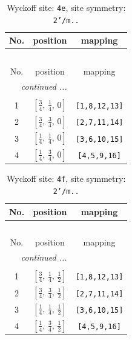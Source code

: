 \documentclass[fleqn,8pt]{jsarticle}
\begin{document}
\begin{longtable}{ccc}
\caption{Wyckoff site: {\tt 4e}, site symmetry: {\tt 2'/m..}}
 \\
 \hline \hline
No. & position & mapping \\ \hline \endfirsthead

\multicolumn{2}{l}{\tablename\ \thetable{}} \\
 \hline \hline
No. & position & mapping \\ \hline \endhead

 \hline \hline
\multicolumn{2}{r}{\footnotesize\it continued ...} \\ \endfoot

 \hline \hline
\multicolumn{2}{r}{} \\ \endlastfoot

1 & $\left[ \frac{3}{4},\, \frac{1}{4},\, 0 \right]$ & {\tt [1,8,12,13]} \\ \hline
2 & $\left[ \frac{3}{4},\, \frac{3}{4},\, 0 \right]$ & {\tt [2,7,11,14]} \\ \hline
3 & $\left[ \frac{1}{4},\, \frac{1}{4},\, 0 \right]$ & {\tt [3,6,10,15]} \\ \hline
4 & $\left[ \frac{1}{4},\, \frac{3}{4},\, 0 \right]$ & {\tt [4,5,9,16]} \\
\end{longtable}
\renewcommand{\arraystretch}{1.2}
\begin{longtable}{ccc}
\caption{Wyckoff site: {\tt 4f}, site symmetry: {\tt 2'/m..}}
 \\
 \hline \hline
No. & position & mapping \\ \hline \endfirsthead

\multicolumn{2}{l}{\tablename\ \thetable{}} \\
 \hline \hline
No. & position & mapping \\ \hline \endhead

 \hline \hline
\multicolumn{2}{r}{\footnotesize\it continued ...} \\ \endfoot

 \hline \hline
\multicolumn{2}{r}{} \\ \endlastfoot

1 & $\left[ \frac{3}{4},\, \frac{1}{4},\, \frac{1}{2} \right]$ & {\tt [1,8,12,13]} \\ \hline
2 & $\left[ \frac{3}{4},\, \frac{3}{4},\, \frac{1}{2} \right]$ & {\tt [2,7,11,14]} \\ \hline
3 & $\left[ \frac{1}{4},\, \frac{1}{4},\, \frac{1}{2} \right]$ & {\tt [3,6,10,15]} \\ \hline
4 & $\left[ \frac{1}{4},\, \frac{3}{4},\, \frac{1}{2} \right]$ & {\tt [4,5,9,16]} \\
\end{longtable}
\end{document}
